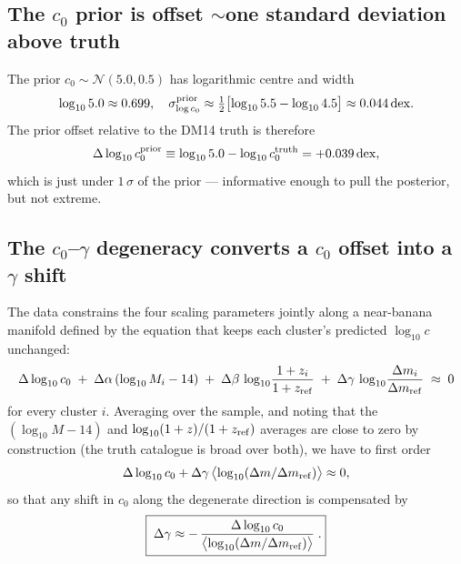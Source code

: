 \documentclass[11pt,a4paper]{article}
\newcommand{\dm}{\Delta m}
\newcommand{\dmref}{\dm_{\rm ref}}
\newcommand{\zref}{z_{\rm ref}}
\newcommand{\dlog}{\Delta\log_{10}}
\begin{document}
\subsection{The $c_0$ prior is offset $\sim$one standard deviation above truth}

The prior $c_0 \sim \mathcal{N}(5.0, 0.5)$ has logarithmic centre and width
\begin{equation}
  \log_{10} 5.0 \approx 0.699,\quad
  \sigma_{\log c_0}^{\rm prior} \approx \tfrac{1}{2}\bigl[\log_{10}5.5 - \log_{10}4.5\bigr] \approx 0.044\,\mathrm{dex}.
\end{equation}
The prior offset relative to the DM14 truth is therefore
\begin{equation}
  \dlog c_0^{\rm prior}
    \equiv \log_{10} 5.0 - \log_{10} c_0^{\rm truth}
    = +0.039\,\mathrm{dex},
  \label{eq:c0_offset}
\end{equation}
which is just under $1\,\sigma$ of the prior — informative enough to pull
the posterior, but not extreme.

\subsection{The $c_0$--$\gamma$ degeneracy converts a $c_0$ offset into a $\gamma$ shift}

The data constrains the four scaling parameters jointly along a near-banana
manifold defined by the equation that keeps each cluster's predicted
$\log_{10}c$ unchanged:
\begin{equation}
  \dlog c_0\;+\;\Delta\alpha\,(\log_{10}M_i - 14)\;
            +\;\Delta\beta\,\log_{10}\!\frac{1+z_i}{1+\zref}\;
            +\;\Delta\gamma\,\log_{10}\!\frac{\dm_i}{\dmref}\;\approx\;0
\end{equation}
for every cluster $i$.  Averaging over the sample, and noting that the
$(\log_{10}M-14)$ and $\log_{10}(1+z)/(1+\zref)$ averages are close to zero by
construction (the truth catalogue is broad over both), we have to first order
\begin{equation}
  \dlog c_0 + \Delta\gamma\,\bigl\langle\log_{10}(\dm/\dmref)\bigr\rangle \approx 0,
  \label{eq:degeneracy}
\end{equation}
so that any shift in $c_0$ along the degenerate direction is compensated by
\begin{equation}
  \boxed{\;\Delta\gamma \approx -\,\dfrac{\dlog c_0}{\bigl\langle\log_{10}(\dm/\dmref)\bigr\rangle}\;.}
  \label{eq:bias_formula}
\end{equation}
\end{document}
